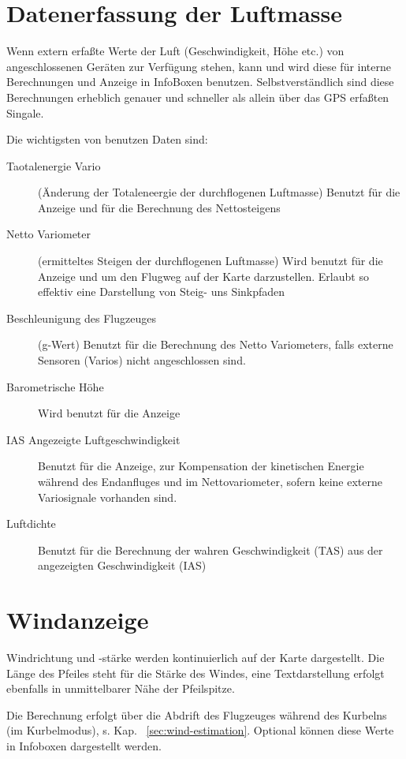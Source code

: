 \section{Datenerfassung der Luftmasse}%

Wenn extern erfaßte Werte der Luft (Geschwindigkeit, Höhe etc.) von angeschlossenen Geräten zur Verfügung
stehen, kann und wird \xc diese für interne Berechnungen und Anzeige in InfoBoxen benutzen.
Selbstverständlich sind diese Berechnungen erheblich genauer und schneller als allein über das GPS
erfaßten Singale.

Die wichtigsten von  \xc benutzen Daten sind:
\begin{description}
\item[Taotalenergie Vario]
(Änderung der Totaleneergie der durchflogenen Luftmasse)
Benutzt für die Anzeige und für die Berechnung des Nettosteigens
\item[Netto Variometer]
(ermitteltes Steigen der durchflogenen Luftmasse)
Wird benutzt für die Anzeige und um den Flugweg auf der Karte darzustellen.
Erlaubt so effektiv eine Darstellung von Steig- uns Sinkpfaden
\item[Beschleunigung des Flugzeuges]
(g-Wert) Benutzt für die Berechnung des Netto Variometers, falls externe Sensoren (Varios) nicht angeschlossen sind.
\item[Barometrische Höhe] Wird benutzt für die Anzeige
\item[IAS Angezeigte Luftgeschwindigkeit]
Benutzt für die Anzeige, zur Kompensation der kinetischen Energie während des Endanfluges  und im Nettovariometer,
sofern keine externe Variosignale vorhanden sind.
\item[Luftdichte] Benutzt für die Berechnung der wahren Geschwindigkeit (TAS) aus der angezeigten Geschwindigkeit (IAS)
\end{description}
\section{Windanzeige}
Windrichtung und -stärke werden kontinuierlich auf der Karte dargestellt.
Die Länge des Pfeiles steht für die Stärke des Windes, eine Textdarstellung erfolgt
ebenfalls in unmittelbarer Nähe der Pfeilspitze.

Die Berechnung erfolgt über die Abdrift des Flugzeuges während des Kurbelns (im Kurbelmodus), s. Kap.~ \ref{sec:wind-estimation}.
Optional können diese Werte in Infoboxen dargestellt werden.

